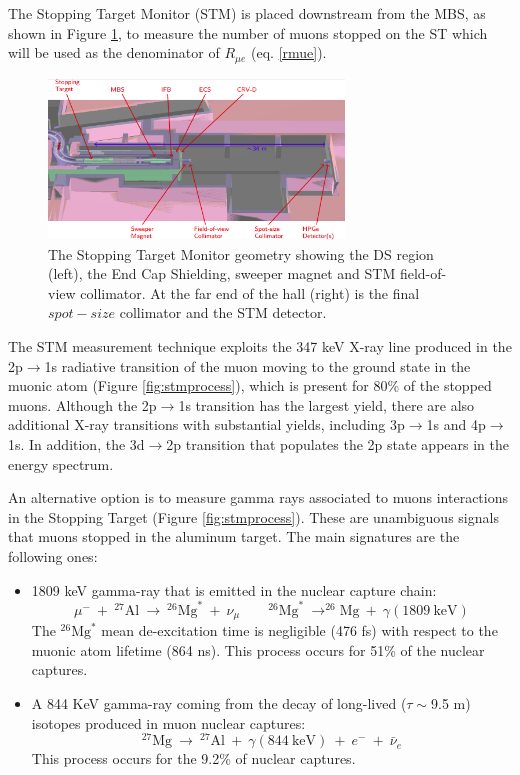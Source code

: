 The Stopping Target Monitor (STM) is placed downstream from the MBS, as shown in Figure \ref{fig:stm}, 
to measure the number of muons stopped on the ST which will be used as the denominator of $R_{\mu e}$ (eq. \ref{rmue}).
\begin{figure}[!h]
    \centering
    \includegraphics[width =0.7\textwidth]{figures/png/Screenshot_20240306_180910.png}
    \caption{The Stopping Target Monitor geometry showing the DS region (left), 
    the End Cap Shielding, sweeper magnet and STM field-of-view collimator. 
    At the far end of the hall (right) is the final $spot-size$ collimator and the STM detector.}
    \label{fig:stm}
    \end{figure}
    The STM measurement technique exploits the 347 keV X-ray line produced in the 2p$\rightarrow$1s 
    radiative transition of the muon moving to the ground state in the muonic atom (Figure \ref{fig:stmprocess}), 
    which is present for 80\% of the stopped muons. Although the 2p$\rightarrow$1s transition has the 
    largest yield, there are also additional X-ray transitions with substantial yields, 
    including 3p$\rightarrow$1s and 4p$\rightarrow$1s. In addition, the 3d$\rightarrow$2p 
    transition that populates the 2p state appears in the energy spectrum.

    An alternative option is to measure gamma rays associated to muons interactions in the Stopping Target (Figure \ref{fig:stmprocess}).
    These are unambiguous signals that muons stopped in the aluminum target. 
    The main signatures are the following ones: 
    \begin{itemize}
    \item 1809 keV gamma-ray that is emitted in the nuclear capture chain:
    \begin{equation}
        \mu^- \ + \ ^{27}\text{Al} \ \rightarrow \ ^{26}\text{Mg}^* \ + \ \nu_\mu \quad \quad ^{26}\text{Mg}^* \ \rightarrow ^{26}\text{Mg} \ + \ \gamma(1809 \ \text{keV})
     \end{equation}
     The $^{26}\text{Mg}^*$ mean de-excitation time is negligible (476 fs) with 
     respect to the muonic atom lifetime (864 ns). 
     This process occurs for 51\% of the nuclear captures.
     \item  A 844 KeV gamma-ray coming from the decay of 
     long-lived ($\tau \sim$9.5 m) isotopes produced in muon nuclear captures:
     \begin{equation}
        ^{27}\text{Mg} \ \rightarrow \ ^{27}\text{Al} \ + \ \gamma(844 \ \text{keV}) \ + \ e^- \ + \ \bar{\nu}_e
     \end{equation}
     This process occurs for the 9.2\% of nuclear captures.
\end{itemize}

